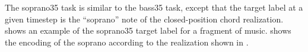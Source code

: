 
The \gls{soprano35} task is similar to the \gls{bass35}
task, except that the target label at a given timestep is
the ``soprano'' note of the \gls{closed-position} chord
realization.  shows an example of the
\gls{soprano35} target label for a fragment of music.
 shows the encoding of the soprano
according to the realization shown in .

